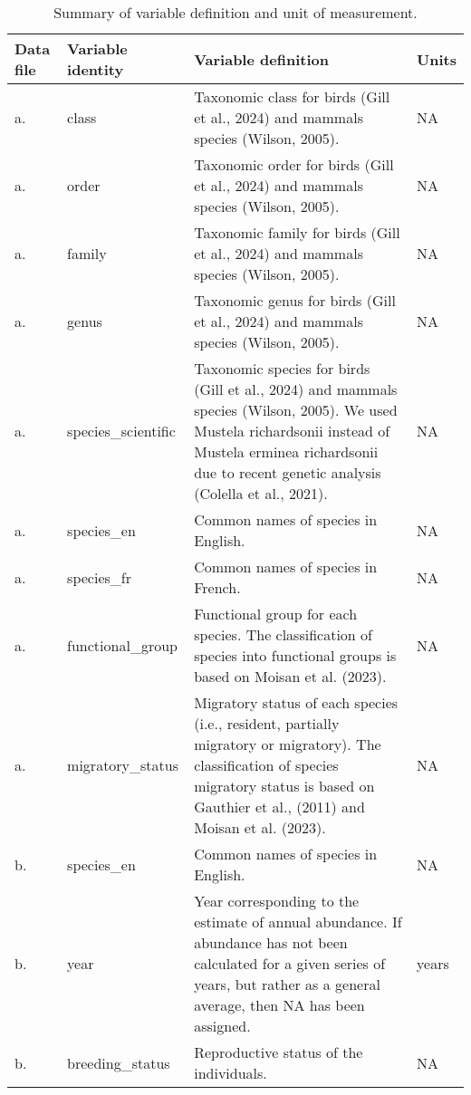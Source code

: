 \begingroup\fontsize{8pt}{10pt}\selectfont
\begin{longtable}{|p{}|p{}|p{}|p{}|}
\caption{Summary of variable definition and unit of measurement.} \\ 
  \hline
{\textbf{Data file}} & {\textbf{Variable identity}} & {\textbf{Variable definition}} & {\textbf{Units}} \\ 
  \hline
a. & class & Taxonomic class  for birds (Gill et al., 2024) and mammals species (Wilson, 2005). & NA \\ 
   \hline
a. & order & Taxonomic order  for birds (Gill et al., 2024) and mammals species (Wilson, 2005). & NA \\ 
   \hline
a. & family & Taxonomic family  for birds (Gill et al., 2024) and mammals species (Wilson, 2005). & NA \\ 
   \hline
a. & genus & Taxonomic genus  for birds (Gill et al., 2024) and mammals species (Wilson, 2005). & NA \\ 
   \hline
a. & species\_scientific & Taxonomic species  for birds (Gill et al., 2024) and mammals species (Wilson, 2005). We used Mustela richardsonii instead of Mustela erminea richardsonii due to recent genetic analysis (Colella et al., 2021). & NA \\ 
   \hline
a. & species\_en & Common names of species in English. & NA \\ 
   \hline
a. & species\_fr & Common names of species in French. & NA \\ 
   \hline
a. & functional\_group & Functional group for each species. The classification of species into functional groups is based on Moisan et al. (2023). & NA \\ 
   \hline
a. & migratory\_status & Migratory status of each species (i.e., resident, partially migratory or migratory). The classification of species migratory status is based on Gauthier et al., (2011)  and Moisan et al. (2023). & NA \\ 
   \hline
b. & species\_en & Common names of species in English. & NA \\ 
   \hline
b. & year & Year corresponding to the estimate of annual abundance. If abundance has not been calculated for a given series of years, but rather as a general average, then NA has been assigned. & years \\ 
   \hline
b. & breeding\_status & Reproductive status of the individuals. & NA \\ 

\end{longtable}
